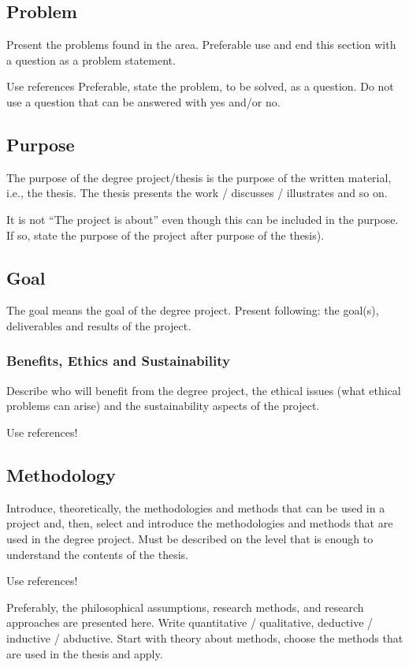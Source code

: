 \subsection{Problem}
Present the problems found in the area. Preferable use and end this section with a question as a problem statement.

Use references
Preferable, state the problem, to be solved, as a question. Do not use a question that can be answered with yes and/or no. 

\subsection{Purpose}
The purpose of the degree project/thesis is the purpose of the written material, i.e., the thesis. The thesis presents the work / discusses / illustrates and so on.

It is not “The project is about” even though this can be included in the purpose. If so, state the purpose of the project after purpose of the thesis).

\subsection{Goal}
The goal means the goal of the degree project. Present following: the goal(s), deliverables and results of the project. 

\subsubsection{Benefits, Ethics and Sustainability}
Describe who will benefit from the degree project, the ethical issues (what ethical problems can arise) and the sustainability aspects of the project.

Use references!

\subsection{Methodology}
Introduce, theoretically, the methodologies and methods that can be used in a project and, then, select and introduce the methodologies and methods that are used in the degree project. Must be described on the level that is enough to understand the contents of the thesis. 

Use references!

Preferably, the philosophical assumptions, research methods, and research approaches are presented here. Write quantitative / qualitative, deductive / inductive / abductive. Start with theory about methods, choose the methods that are used in the thesis and apply. 


